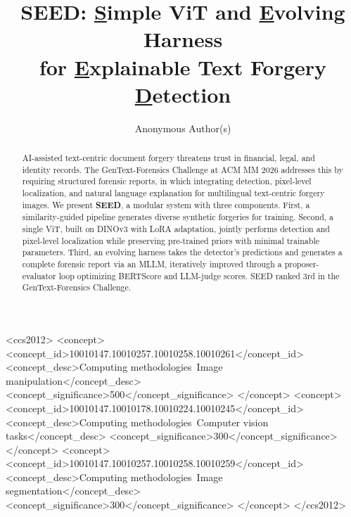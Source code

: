 \documentclass[sigconf, screen, review, anonymous]{acmart}
\begin{document}
\title{SEED: \underline{S}imple ViT and \underline{E}volving Harness \\ for \underline{E}xplainable Text Forgery \underline{D}etection}

\author{Anonymous Author(s)}

\renewcommand{\shortauthors}{Anonymous Author(s)}

\begin{abstract}
AI-assisted text-centric document forgery threatens trust in financial, legal, and identity records. The GenText-Forensics Challenge at ACM MM 2026 addresses this by requiring structured forensic reports, in which integrating detection, pixel-level localization, and natural language explanation for multilingual text-centric forgery images. We present \textbf{SEED}, a modular system with three components. First, a similarity-guided pipeline generates diverse synthetic forgeries for training. Second, a single ViT, built on DINOv3 with LoRA adaptation, jointly performs detection and pixel-level localization while preserving pre-trained priors with minimal trainable parameters. Third, an evolving harness takes the detector's predictions and generates a complete forensic report via an MLLM, iteratively improved through a proposer-evaluator loop optimizing BERTScore and LLM-judge scores. SEED ranked 3rd in the GenText-Forensics Challenge.
\end{abstract}

\begin{CCSXML}
<ccs2012>
 <concept>
  <concept_id>10010147.10010257.10010258.10010261</concept_id>
  <concept_desc>Computing methodologies~Image manipulation</concept_desc>
  <concept_significance>500</concept_significance>
 </concept>
 <concept>
  <concept_id>10010147.10010178.10010224.10010245</concept_id>
  <concept_desc>Computing methodologies~Computer vision tasks</concept_desc>
  <concept_significance>300</concept_significance>
 </concept>
 <concept>
  <concept_id>10010147.10010257.10010258.10010259</concept_id>
  <concept_desc>Computing methodologies~Image segmentation</concept_desc>
  <concept_significance>300</concept_significance>
 </concept>
</ccs2012>
\end{CCSXML}

\end{document}
